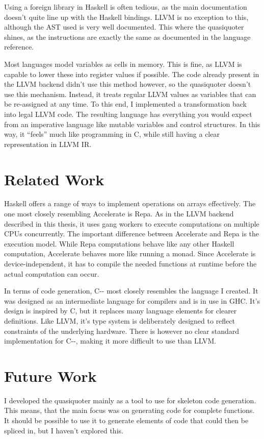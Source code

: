 \documentclass[a4paper,bibliography=totocnumbered,parskip,headsepline]{scrbook}
\begin{document}
Using a foreign library in Haskell is often tedious, as the main documentation doesn't quite line up with the Haskell bindings.
LLVM is no exception to this, although the AST used is very well documented.
This where the quasiquoter shines, as the instructions are exactly the same as documented in the language reference.

Most languages model variables as cells in memory.
This is fine, as LLVM is capable to lower these into register values if possible.
The code already present in the LLVM backend didn't use this method however, so the quasiquoter doesn't use this mechanism.
Instead, it treats regular LLVM values as variables that can be re-assigned at any time.
To this end, I implemented a transformation back into legal LLVM code.
The resulting language has everything you would expect from an imperative language like mutable variables and control structures.
In this way, it ``feels'' much like programming in C, while still having a clear representation in LLVM IR.

\section{Related Work}
Haskell offers a range of ways to implement operations on arrays effectively.
The one most closely resembling Accelerate is Repa.
As in the LLVM backend described in this thesis, it uses gang workers to execute computations on multiple CPUs concurrently.
The important difference between Accelerate and Repa is the execution model.
While Repa computations behave like any other Haskell computation, Accelerate behaves more like running a monad.
Since Accelerate is device-independent, it has to compile the needed functions at runtime before the actual computation can occur.

In terms of code generation, C-\hspace{0pt}- most closely resembles the language I created.
It was designed as an intermediate language for compilers and is in use in GHC.
It's design is inspired by C, but it replaces many language elements for clearer definitions.
Like LLVM, it's type system is deliberately designed to reflect constraints of the underlying hardware.
There is however no clear standard implementation for C-\hspace{0pt}-, making it more difficult to use than LLVM.

\section{Future Work}
I developed the quasiquoter mainly as a tool to use for skeleton code generation.
This means, that the main focus was on generating code for complete functions.
It should be possible to use it to generate elements of code that could then be spliced in, but I haven't explored this.
\end{document}
